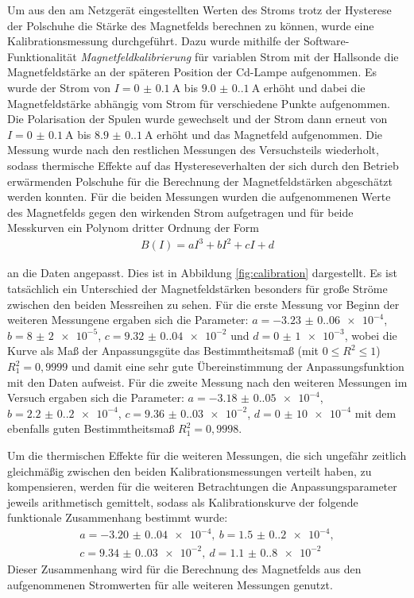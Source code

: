 Um aus den am Netzgerät eingestellten Werten des Stroms trotz der Hysterese der Polschuhe die Stärke des Magnetfelds berechnen zu können, wurde eine Kalibrationsmessung durchgeführt.
Dazu wurde mithilfe der Software-Funktionalität \textit{Magnetfeldkalibrierung} für variablen Strom mit der Hallsonde die Magnetfeldstärke an der späteren Position der Cd-Lampe aufgenommen. Es wurde der Strom von $I=\SI{0(0.1)}{\ampere}$ bis $\SI{9.0(0.1)}{\ampere}$ erhöht und dabei die Magnetfeldstärke abhängig vom Strom für verschiedene Punkte aufgenommen. Die Polarisation der Spulen wurde gewechselt und der Strom dann erneut von $I=\SI{0(0.1)}{\ampere}$ bis $\SI{8.9(0.1)}{\ampere}$ erhöht und das Magnetfeld aufgenommen. Die Messung wurde nach den restlichen Messungen des Versuchsteils wiederholt, sodass thermische Effekte auf das Hystereseverhalten der sich durch den Betrieb erwärmenden Polschuhe für die Berechnung der Magnetfeldstärken abgeschätzt werden konnten. Für die beiden Messungen wurden die aufgenommenen Werte des Magnetfelds gegen den wirkenden Strom aufgetragen und für beide Messkurven ein Polynom dritter Ordnung der Form
\begin{align*}
	B(I)=aI^3+bI^2+cI+d
\end{align*}

an die Daten angepasst. Dies ist in Abbildung \ref{fig:calibration} dargestellt. Es ist tatsächlich ein Unterschied der Magnetfeldstärken besonders für große Ströme zwischen den beiden Messreihen zu sehen.
Für die erste Messung vor Beginn der weiteren Messungene ergaben sich die Parameter: $a=\num{-3.23(0.06)e-4}$, $b=\num{8(2)e-5}$, $c=\num{9.32(0.04)e-2}$ und $d=\num{0(1)e-3}$, wobei die Kurve als Maß der Anpassungsgüte das Bestimmtheitsmaß (mit $0\leq R^2\leq 1$) $R^2_1=0,9999$ und damit eine sehr gute Übereinstimmung der Anpassungsfunktion mit den Daten aufweist. Für die zweite Messung nach den weiteren Messungen im Versuch ergaben sich die Parameter: $a=\num{-3.18(0.05)e-4}$, $b=\num{2.2(0.2)e-4}$, $c=\num{9.36(0.03)e-2}$, $d=\num{0(10)e-4}$ mit dem ebenfalls guten Bestimmtheitsmaß $R^2_1=0,9998$.

Um die thermischen Effekte für die weiteren Messungen, die sich ungefähr zeitlich gleichmäßig zwischen den beiden Kalibrationsmessungen verteilt haben, zu kompensieren, werden für die weiteren Betrachtungen die Anpassungsparameter jeweils arithmetisch gemittelt, sodass als Kalibrationskurve der folgende funktionale Zusammenhang bestimmt wurde:
\begin{align} \label{eq:kalibration}
	a = \num{-3.20(0.04)e-4},~ b = \num{1.5(0.2)e-4}, \\ \nonumber
	c = \num{9.34(0.03)e-2},~ d=\num{1.1(0.8)e-2}
\end{align}
Dieser Zusammenhang wird für die Berechnung des Magnetfelds aus den aufgenommenen Stromwerten für alle weiteren Messungen genutzt.

